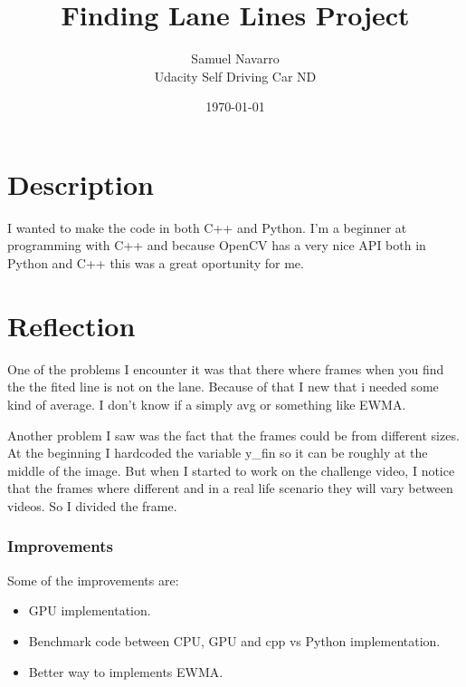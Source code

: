\documentclass[11pt, a4paper]{article}
\begin{document}
\title{Finding Lane Lines Project}
\author{Samuel Navarro \\ Udacity Self Driving Car ND}
\date{\today}
\maketitle
	
	\section{Description}%
	\label{sec:description}

	I wanted to make the code in both C++ and Python. I'm a beginner at programming with C++ and because OpenCV has a very nice API both in Python and C++ this was a great oportunity for me.


	\section{Reflection}%
	\label{sec:problems}
	
	One of the problems I encounter it was that there where frames when you find the the fited line is not on the lane. Because of that I new that i needed some kind of average. I don't know if a simply avg or something like EWMA.


	Another problem I saw was the fact that the frames could be from different sizes. At the beginning I hardcoded the variable y\_fin so it can be roughly at the middle of the image. But when I started to work on the challenge video, I notice that the frames where different and in a real life scenario they will vary between videos. So I divided the frame.


	\subsubsection{Improvements}%
	\label{ssub:improvements}
	
		
	Some of the improvements are:
	\begin{itemize}
		\item GPU implementation.
		\item Benchmark code between CPU, GPU and cpp vs Python implementation.
		\item Better way to implements EWMA.
	\end{itemize}
	
\end{document}
